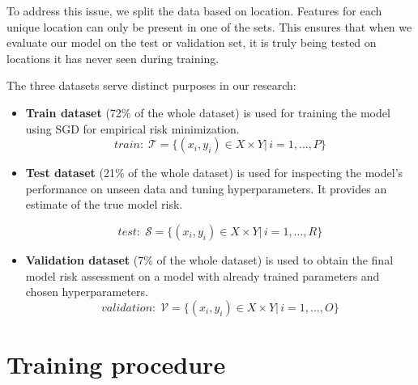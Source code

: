 To address this issue, we split the data based on location. Features for each unique location can only be present in one of the sets. This ensures that when we evaluate our model on the test or validation set, it is truly being tested on locations it has never seen during training.


The three datasets serve distinct purposes in our research:

\begin{itemize}
    \item \textbf{Train dataset} (72\% of the whole dataset) is used for training the model using \acrlong{SGD} for empirical risk minimization.
          \[
              \label{eq:train}
              \textit{train}: \; \mathcal{T} = \{(x_i, y_i) \in X \times Y |\, i = 1,\dots, P\}
          \]
          \vspace{3mm}


    \item \textbf{Test dataset} (21\% of the whole dataset) is used for inspecting the model's performance on unseen data and tuning hyperparameters. It provides an estimate of the true model risk.

          \[
              \label{eq:test}
              \textit{test}: \; \mathcal{S} = \{(x_i, y_i) \in X \times Y |\, i = 1,\dots, R\}
          \]
          \vspace{3mm}
    \item \textbf{Validation dataset} (7\% of the whole dataset) is used to obtain the final model risk assessment on a model with already trained parameters and chosen hyperparameters.
          \[
              \label{eq:validation}
              \textit{validation}: \; \mathcal{V} = \{(x_i, y_i) \in X \times Y |\, i = 1,\dots, O\}
          \]
\end{itemize}

\section{Training procedure}

